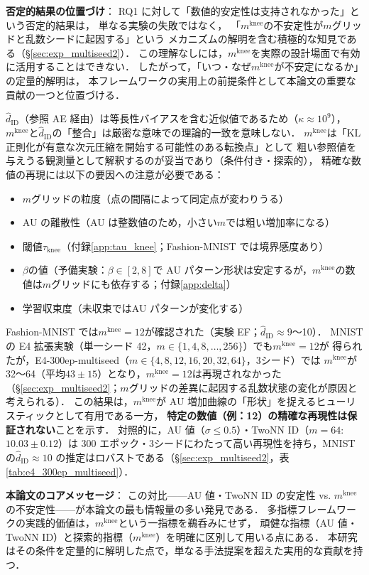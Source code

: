 \documentclass[11pt,a4paper]{jsarticle}
\newcommand{\kap}{\kappa}
\newcommand{\mknee}{m^{\mathrm{knee}}}
\begin{document}
\textbf{否定的結果の位置づけ}：
RQ1 に対して「数値的安定性は支持されなかった」という否定的結果は，
単なる実験の失敗ではなく，
「$\mknee$の不安定性が$m$グリッドと乱数シードに起因する」という
メカニズムの解明を含む積極的な知見である（§\ref{sec:exp_multiseed2}）．
この理解なしには，$\mknee$を実際の設計場面で有効に活用することはできない．
したがって，「いつ・なぜ$\mknee$が不安定になるか」の定量的解明は，
本フレームワークの実用上の前提条件として本論文の重要な貢献の一つと位置づける．

$\hat{d}_\mathrm{ID}$（参照 AE 経由）は等長性バイアスを含む近似値であるため（$\kap \approx 10^9$），
$\mknee$と$\hat{d}_\mathrm{ID}$の「整合」は厳密な意味での理論的一致を意味しない．
$\mknee$は「KL 正則化が有意な次元圧縮を開始する可能性のある転換点」として
粗い参照値を与えうる観測量として解釈するのが妥当であり（条件付き・探索的），
精確な数値の再現には以下の要因への注意が必要である：
\begin{itemize}
  \item $m$グリッドの粒度（点の間隔によって同定点が変わりうる）
  \item AU の離散性（AU は整数値のため，小さい$m$では粗い増加率になる）
  \item 閾値$\tau_{\mathrm{knee}}$（付録\ref{app:tau_knee}；Fashion-MNIST では境界感度あり）
  \item $\beta$の値（予備実験：$\beta \in [2, 8]$で AU パターン形状は安定するが，$\mknee$の数値は$m$グリッドにも依存する；付録\ref{app:delta}）
  \item 学習収束度（未収束ではAU パターンが変化する）
\end{itemize}

Fashion-MNIST では$\mknee = 12$が確認された（実験 EF；$\hat{d}_\mathrm{ID} \approx 9$〜10）．
MNIST の E4 拡張実験（単一シード 42，$m \in \{1, 4, 8, \ldots, 256\}$）でも$\mknee = 12$が
得られたが，E4-300ep-multiseed（$m \in \{4, 8, 12, 16, 20, 32, 64\}$，3シード）では
$\mknee$が 32〜64（平均$43 \pm 15$）となり，$\mknee = 12$は再現されなかった
（§\ref{sec:exp_multiseed2}；$m$グリッドの差異に起因する乱数状態の変化が原因と考えられる）．
この結果は，$\mknee$が AU 増加曲線の「形状」を捉えるヒューリスティックとして有用である一方，
\textbf{特定の数値（例：12）の精確な再現性は保証されない}ことを示す．
対照的に，AU 値（$\sigma \leq 0.5$）・TwoNN ID（$m=64$: $10.03 \pm 0.12$）は
300 エポック・3シードにわたって高い再現性を持ち，MNIST の$\hat{d}_\mathrm{ID} \approx 10$
の推定はロバストである（§\ref{sec:exp_multiseed2}，表\ref{tab:e4_300ep_multiseed}）．

\textbf{本論文のコアメッセージ}：
この対比——AU 値・TwoNN ID の安定性 vs. $\mknee$の不安定性——が本論文の最も情報量の多い発見である．
多指標フレームワークの実践的価値は，$\mknee$という一指標を鵜呑みにせず，
頑健な指標（AU 値・TwoNN ID）と探索的指標（$\mknee$）を明確に区別して用いる点にある．
本研究はその条件を定量的に解明した点で，単なる手法提案を超えた実用的な貢献を持つ．
\end{document}
